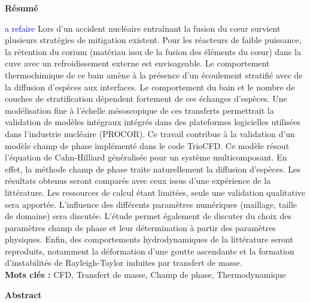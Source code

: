 \documentclass[a4paper,11pt]{report}    %
\begin{document}
\begin{titlepage}
\begin{center}
    \end{center}
\end{titlepage}




\thispagestyle{empty}
\begin{center}
    \Large
    \vspace{0.9cm}
    \textbf{Résumé} 
\end{center}
\textcolor{blue}{a refaire}
\color{red}
Lors d'un accident nucléaire entraînant la fusion du c\oe ur survient plusieurs stratégies de mitigation existent. Pour les réacteurs de faible puissance, la rétention du corium (matériau issu de la fusion des éléments du c\oe ur) dans la cuve avec un refroidissement externe est envisageable. Le comportement thermochimique de ce bain amène à la présence d'un écoulement stratifié avec de la diffusion d'espèces aux interfaces. Le comportement du bain et le nombre de couches de stratification dépendent fortement de ces échanges d'espèces. Une modélisation fine à l'échelle mésoscopique de ces transferts permettrait la validation de modèles intégraux intégrés dans des plateformes logicielles utilisées dans l'industrie nucléaire (PROCOR). Ce travail contribue à la validation d'un modèle champ de phase implémenté dans le code TrioCFD. Ce modèle résout l'équation de Cahn-Hilliard généralisée pour un système multicomposant. En effet, la méthode champ de phase traite naturellement la diffusion d'espèces. Les résultats obtenus seront comparés avec ceux issus d'une expérience de la littérature. Les ressources de calcul étant limitées, seule une validation qualitative sera apportée. L'influence des différents paramètres numériques (maillage, taille de domaine) sera discutée. L'étude permet également de discuter du choix des paramètres champ de phase et leur détermination à partir des paramètres physiques. Enfin, des comportements hydrodynamiques de la littérature seront reproduits, notamment la déformation d'une goutte ascendante et la formation d'instabilités de Rayleigh-Taylor induites par transfert de masse.
\color{black}
\vspace{0.3cm}\\
\noindent\textbf{Mots clés :} CFD, Transfert de masse, Champ de phase, Thermodynamique
\begin{center}
	\Large
	\vspace{0.6cm}
	\textbf{Abstract}
\end{center}
\end{document}
